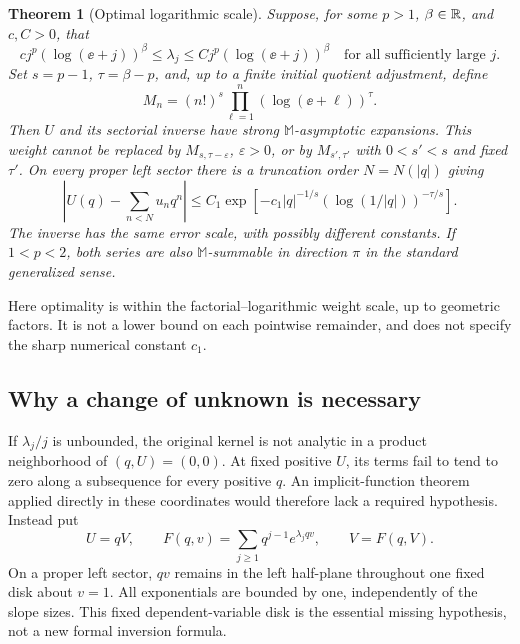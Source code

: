 \documentclass[11pt,a4paper]{article}
\numberwithin{equation}{section}
\newtheorem{theorem}{Theorem}[section]
\theoremstyle{definition}\newtheorem{definition}[theorem]{Definition}
\theoremstyle{remark}\newtheorem{remark}[theorem]{Remark}
\newcommand{\M}{\mathbb M}\newcommand{\CM}{\mathcal C_{\M}}
\begin{document}
\begin{theorem}[Optimal logarithmic scale]
\label{thm:logheadline}
Suppose, for some $p>1$, $\beta\in\mathbb R$, and $c,C>0$, that
\begin{equation}
 cj^p(\log(\ee+j))^\beta\le\lambda_j
 \le Cj^p(\log(\ee+j))^\beta
 \quad\text{for all sufficiently large }j.
 \label{eq:twosidedslopes}
\end{equation}
Set $s=p-1$, $\tau=\beta-p$, and, up to a finite initial quotient
adjustment, define
\begin{equation}
 M_n=(n!)^s\prod_{\ell=1}^n(\log(\ee+\ell))^\tau.
 \label{eq:logweight}
\end{equation}
Then $U$ and its sectorial inverse have strong $\M$-asymptotic expansions.
This weight cannot be replaced by $M_{s,\tau-\varepsilon}$,
$\varepsilon>0$, or by $M_{s',\tau'}$ with $0<s'<s$ and fixed $\tau'$.
On every proper left sector there is a truncation order $N=N(|q|)$ giving
\begin{equation}
 \left|U(q)-\sum_{n<N}u_nq^n\right|
 \le C_1\exp\!\left[-c_1|q|^{-1/s}
                        (\log(1/|q|))^{-\tau/s}\right].
 \label{eq:optimized-headline}
\end{equation}
The inverse has the same error scale, with possibly different constants.
If $1<p<2$, both series are also $\M$-summable in direction $\pi$ in the
standard generalized sense.
\end{theorem}
Here optimality is within the factorial--logarithmic weight scale, up to
geometric factors. It is not a lower bound on each pointwise remainder,
and does not specify the sharp numerical constant $c_1$.

\subsection{Why a change of unknown is necessary}
If $\lambda_j/j$ is unbounded, the original kernel is not analytic in a
product neighborhood of $(q,U)=(0,0)$. At fixed positive $U$, its terms
fail to tend to zero along a subsequence for every positive $q$.
An implicit-function theorem applied directly in these coordinates would
therefore lack a required hypothesis.
Instead put
\begin{equation}
 U=qV,\qquad F(q,v)=\sum_{j\ge1}q^{j-1}e^{\lambda_jqv},
 \qquad V=F(q,V).
 \label{eq:desing}
\end{equation}
On a proper left sector, $qv$ remains in the left half-plane throughout
one fixed disk about $v=1$. All exponentials are bounded by one,
independently of the slope sizes. This fixed dependent-variable disk is
the essential missing hypothesis, not a new formal inversion formula.
\end{document}
